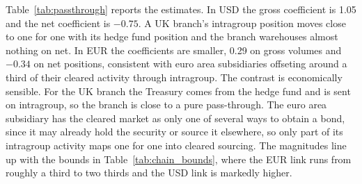 \documentclass[english, 11pt, oneside, legal]{article}
\begin{document}
Table~\ref{tab:passthrough} reports the estimates. In USD the gross coefficient is 1.05 and the net coefficient is $-0.75$. A UK branch's intragroup position moves close to one for one with its hedge fund position and the branch warehouses almost nothing on net. In EUR the coefficients are smaller, 0.29 on gross volumes and $-0.34$ on net positions, consistent with euro area subsidiaries offseting around a third of their cleared activity through intragroup. The contrast is economically sensible. For the UK branch the Treasury comes from the hedge fund and is sent on intragroup, so the branch is close to a pure pass-through. The euro area subsidiary has the cleared market as only one of several ways to obtain a bond, since it may already hold the security or source it elsewhere, so only part of its intragroup activity maps one for one into cleared sourcing. The magnitudes line up with the bounds in Table~\ref{tab:chain_bounds}, where the EUR link runs from roughly a third to two thirds and the USD link is markedly higher.
\end{document}
